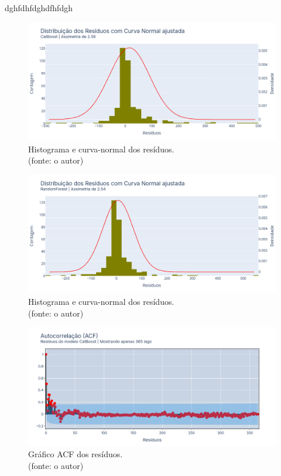 dghfdhfdghdfhfdgh

\begin{figure}[!h]
\centering
\includegraphics[scale=0.33]{Figuras/jequiti/resultados/CB_WFV_LOG_RESID_x_CURVA_NORMAL.png}
\caption{Histograma e curva-normal dos resíduos.\\(fonte: o autor)}
\label{fig:jequiti_CB_WFV_LOG_RESID_x_CURVA_NORMAL}
\end{figure}

\begin{figure}[!h]
\centering
\includegraphics[scale=0.33]{Figuras/jequiti/resultados/RF_WFV_LOG_RESID_x_CURVA_NORMAL.png}
\caption{Histograma e curva-normal dos resíduos.\\(fonte: o autor)}
\label{fig:jequiti_RF_WFV_LOG_RESID_x_CURVA_NORMAL}
\end{figure}

\begin{figure}[!h]
\centering
\includegraphics[scale=0.33]{Figuras/jequiti/resultados/CB_WFV_LOG_RESID_ACF.png}
\caption{Gráfico ACF dos resíduos.\\(fonte: o autor)}
\label{fig:jequiti_CB_WFV_LOG_RESID_ACF}
\end{figure}

